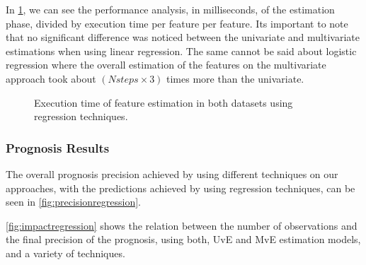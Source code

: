 In \ref{fig:estimationtimeregression}, we can see the performance analysis, in milliseconds, of the estimation phase, divided by execution time 
per feature per feature. Its important to note that no significant difference was noticed between the univariate and multivariate estimations 
when using linear regression. The same cannot be said about logistic regression where the overall estimation of the features on the multivariate
approach took about $(N steps \times 3)$ times more than the univariate.

\begin{figure}
  \begin{subfigmatrix}{2}
  \end{subfigmatrix}
  \caption{Execution time of feature estimation in both datasets using regression techniques.}
  \label{fig:estimationtimeregression}
\end{figure}

\subsubsection{Prognosis Results}
\label{subsubsection:prognosis_regression}

The overall prognosis precision achieved by using different techniques on our approaches, with the predictions achieved by using regression 
techniques, can be seen in \ref{fig:precisionregression}. 

\ref{fig:impactregression} shows the relation between the number of observations and the final precision of the prognosis, using both, UvE and MvE
 estimation models, and a variety of techniques.

